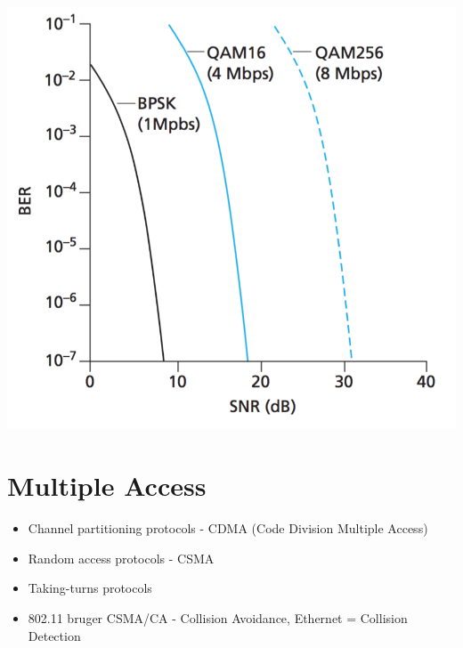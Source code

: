 \includegraphics[scale=0.6]{6-wireless/snr-to-ber.png}

\section{Multiple Access}
\begin{itemize}
	\item Channel partitioning protocols - CDMA (Code Division Multiple Access)
	\item Random access protocols - CSMA
	\item Taking-turns protocols
	\item 802.11 bruger CSMA/CA - Collision Avoidance, Ethernet = Collision Detection
\end{itemize}
